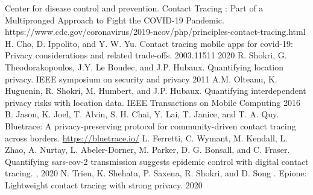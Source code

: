 \begin{thebibliography}{10}
\itemsep=1pt
\begin{small}
 Center for disease control and prevention. \newblock Contact Tracing : Part of a Multipronged Approach to Fight the COVID-19 Pandemic. \newblock https://www.cdc.gov/coronavirus/2019-ncov/php/principles-contact-tracing.html
 H. Cho, D. Ippolito, and Y. W. Yu. \newblock Contact tracing mobile apps for covid-19: Privacy considerations and related trade-offs.  2003.11511 2020
 R. Shokri, G. Theodorakopoulos, J.Y. Le Boudec, and J.P. Hubaux. \newblock Quantifying location privacy. \newblock IEEE symposium on security and privacy 2011
 A.M. Olteanu, K. Huguenin, R. Shokri, M. Humbert, and J.P. Hubaux. \newblock Quantifying interdependent privacy risks with location data. \newblock IEEE Transactions on Mobile Computing 2016
 B. Jason, K. Joel, T. Alvin, S. H. Chai, Y. Lai, T. Janice, and T. A. Quy. \newblock Bluetrace: A privacy-preserving
protocol for community-driven contact tracing across borders. \newblock  \url{https://bluetrace.io/}
  L. Ferretti, C. Wymant, M. Kendall, L. Zhao, A. Nurtay, L. Abeler-Dorner, M. Parker, D. G. Bonsall, and
C. Fraser. \newblock Quantifying sars-cov-2 transmission suggests epidemic control with digital contact tracing. , 2020
 N. Trieu, K. Shehata, P. Saxena, R. Shokri, and D. Song . \newblock Epione: Lightweight contact tracing with strong privacy.  2020


\end{small}
\end{thebibliography}
